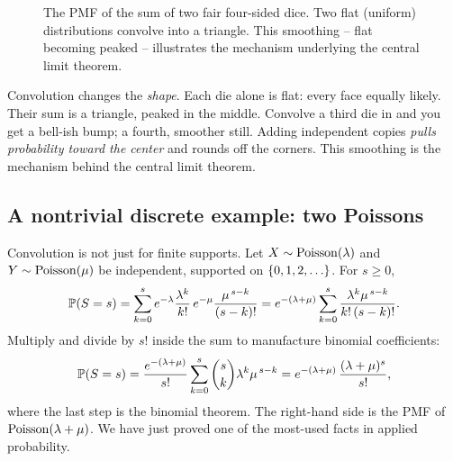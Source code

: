 \begin{figure}[H]
\centering
{}
\caption{The PMF of the sum of two fair four-sided dice. Two flat
(uniform) distributions convolve into a triangle. This smoothing --
flat becoming peaked -- illustrates the mechanism underlying the central limit theorem.}
\label{ch17:fig-dice}
\end{figure}

\begin{aestheticbox}
Convolution changes the \emph{shape}. Each die alone is flat:
every face equally likely. Their sum is a triangle, peaked in the middle.
Convolve a third die in and you get a bell-ish bump; a fourth, smoother
still. Adding independent copies \emph{pulls probability toward the center}
and rounds off the corners. This smoothing is the mechanism behind the
central limit theorem.
\end{aestheticbox}

\subsection{A nontrivial discrete example: two Poissons}

Convolution is not just for finite supports. Let
$X \sim \Pois(\lambda)$ and $Y\sim\Pois(\mu)$ be independent, supported on
$\set{0,1,2,\dots}$. For $s\ge 0$,
\[
\P(S=s) = \sum_{k=0}^{s} e^{-\lambda}\frac{\lambda^k}{k!}\,
          e^{-\mu}\frac{\mu^{\,s-k}}{(s-k)!}
        = e^{-(\lambda+\mu)} \sum_{k=0}^{s} \frac{\lambda^k \mu^{\,s-k}}{k!\,(s-k)!}.
\]
Multiply and divide by $s!$ inside the sum to manufacture binomial
coefficients:
\[
\P(S=s) = \frac{e^{-(\lambda+\mu)}}{s!}
          \sum_{k=0}^{s} \binom{s}{k}\lambda^k \mu^{\,s-k}
        = e^{-(\lambda+\mu)}\,\frac{(\lambda+\mu)^s}{s!},
\]
where the last step is the binomial theorem. The right-hand side is the
PMF of $\Pois(\lambda+\mu)$. We have just proved one of the most-used
facts in applied probability.

